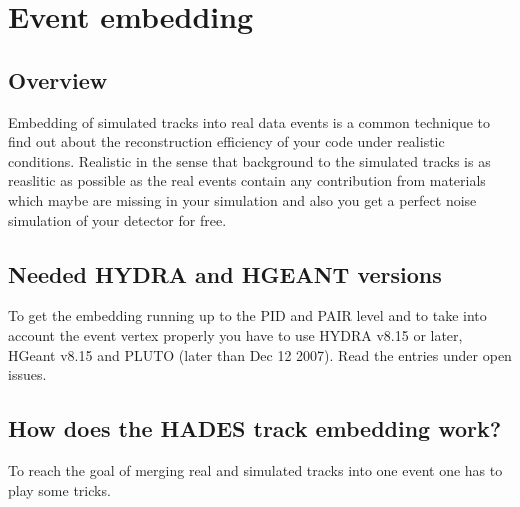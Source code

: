 \chapter{Event embedding}\label{Chapter_embedding}

\section{Overview}

Embedding of simulated tracks into real data events is a common 
technique to find out about the reconstruction efficiency of your 
code under realistic conditions. Realistic in the sense that 
background to the simulated tracks is as reaslitic as possible 
as the real events contain any contribution from materials which 
maybe are missing in your simulation and also you get a perfect 
noise simulation of your detector for free.

\section{Needed HYDRA and HGEANT versions}

To get the embedding running up to the PID and PAIR level and to take 
into account the event vertex properly you have to use HYDRA v8.15 or later, 
HGeant v8.15 and PLUTO (later than Dec 12 2007). Read the entries under 
open issues.


\section{How does the HADES track embedding work?}

To reach the goal of merging real and simulated tracks into one event one 
has to play some tricks.

